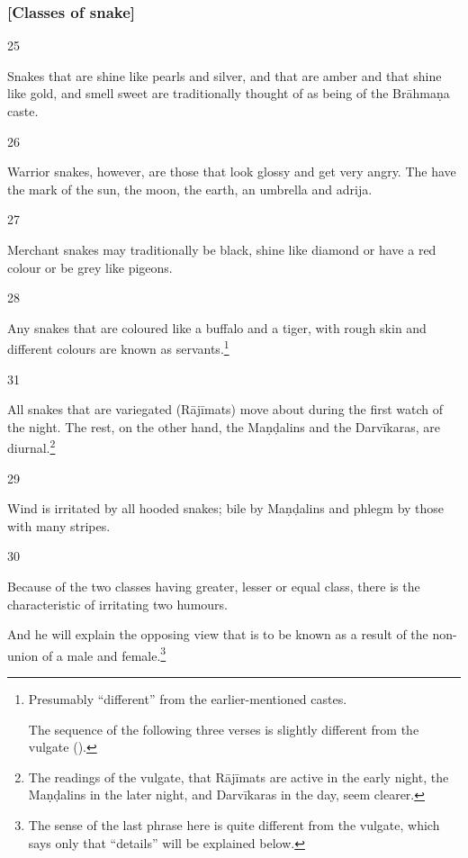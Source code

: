 \begin{translation}
\subsubsection{[Classes of snake]}

\item[25]

Snakes that are shine like pearls and silver, and that are amber and that
shine like gold, and smell sweet are traditionally thought of as being of
the Brāhmaṇa caste.

\item [26]

Warrior snakes, however, are those that look glossy and get very angry.
The have the mark of the sun, the moon, the earth, an umbrella and
\gls{adrija}.

\item [27]

Merchant snakes may traditionally be black, shine like diamond or have a
red colour or be grey like pigeons.


\item [28]

Any snakes that are coloured like a buffalo and a tiger, with rough skin
and different colours are known as servants.\footnote{Presumably
    “different” from the earlier-mentioned castes.
    
    The sequence of the following three verses is slightly different from the
vulgate ().}

\item[31]

All snakes that are variegated (Rājīmats) move about during the first watch
of the night.  The rest, on the other hand, the Maṇḍalins and the
Darvīkaras, are diurnal.\footnote{The readings of the vulgate, that Rājīmats are 
active in the early night, the Maṇḍalins in the later night, and Darvīkaras in the 
day, seem clearer.}

\item[29]

Wind is irritated by all hooded snakes; bile by Maṇḍalins and phlegm by those 
with many  stripes.

\item [30]

Because of the two classes having greater, lesser or equal class, there is the 
characteristic of irritating two humours.  

And he will explain the opposing view that is to be known as a result of the 
non-union of a male and female.\footnote{The 
sense of the last phrase here is quite different from the vulgate, which says 
only that “details” will be explained below.}



\end{translation}
